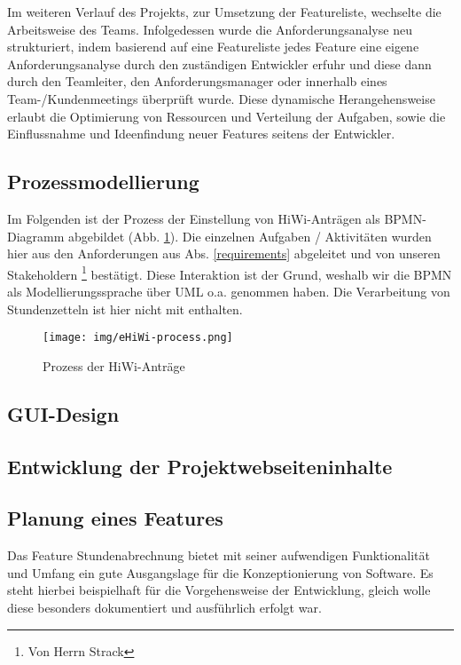 \documentclass[12pt,a4paper]{scrartcl}
\begin{document}
Im weiteren Verlauf des Projekts, zur Umsetzung der Featureliste, wechselte die Arbeitsweise des Teams. Infolgedessen wurde die Anforderungsanalyse neu strukturiert, indem basierend auf eine Featureliste jedes Feature eine eigene Anforderungsanalyse durch den zuständigen Entwickler erfuhr und diese dann durch den Teamleiter, den Anforderungsmanager oder innerhalb eines Team-/Kundenmeetings überprüft wurde. Diese dynamische Herangehensweise erlaubt die Optimierung von Ressourcen und Verteilung der Aufgaben, sowie die Einflussnahme und Ideenfindung neuer Features seitens der Entwickler. 

\subsection{Prozessmodellierung}
\label{processmodel}
Im Folgenden ist der Prozess der Einstellung von HiWi-Anträgen als BPMN-Diagramm abgebildet (Abb. \ref{fig:bpmn-process}).
Die einzelnen Aufgaben / Aktivitäten wurden hier aus den Anforderungen aus Abs. \ref{requirements} abgeleitet und von unseren Stakeholdern \footnote{Von Herrn Strack} bestätigt.
Diese Interaktion ist der Grund, weshalb wir die BPMN als Modellierungssprache über UML o.a. genommen haben.
Die Verarbeitung von Stundenzetteln ist hier nicht mit enthalten.

\begin{figure}[H]
	\centering
	\texttt{[image: img/eHiWi-process.png]}
	\caption{Prozess der HiWi-Anträge}
	\label{fig:bpmn-process}
\end{figure}

\subsection{GUI-Design}

\subsection{Entwicklung der Projektwebseiteninhalte}

\subsection{Planung eines Features}

Das Feature Stundenabrechnung bietet mit seiner aufwendigen Funktionalität und Umfang ein gute Ausgangslage für die Konzeptionierung von Software. Es steht hierbei beispielhaft für die Vorgehensweise der Entwicklung, gleich wolle diese besonders dokumentiert und ausführlich erfolgt war.
\end{document}
